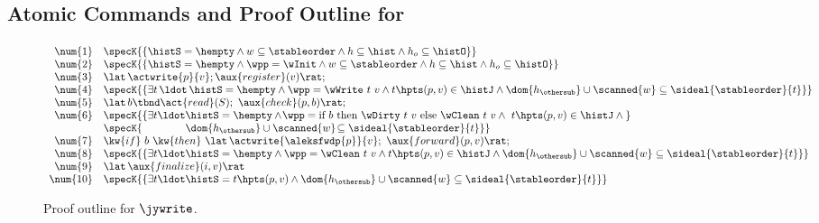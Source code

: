 \subsection{Atomic Commands and Proof Outline for \jywrite}
\label{sc:atoms-write}

\begin{figure}[t]
\[
\begin{array}[t]{r l}
  \num{1} & \specK{\{ \histS = \hempty  \wedge
                      w \subseteq \stableorder \wedge h \subseteq \hist \wedge h_o \subseteq \histO \}} \\
  \num{2} & \specK{\{ \histS = \hempty \wedge \wpp =\wInit \wedge
                      w \subseteq \stableorder \wedge h \subseteq \hist \wedge h_o \subseteq \histO \}}\\
  \num{3} &\lat\,\actwrite{p}{v}; \aux{register}(v) \rat; \\
  \num{4} & \specK{\{\exists t\, \ldot\,
                      \histS = \hempty \wedge
                      \wpp = \wWrite\ t\ v \wedge t\hpts(p,v) \in \histJ \wedge
                      \dom{h_{\othersub}} \cup \scanned{w}
                      \subseteq \sideal{\stableorder}{t}\}}\\
  \num{5} & \lat\, b \tbnd \act{read}(S);\ \aux{check}(p,b) \rat;\\
  \num{6} & \specK{\{\exists t\ldot \histS = \hempty \wedge\!
               \wpp =  \textrm{if}\ b\
               \textrm{then}\ \wDirty\ t\ v\ \textrm{else}\ \wClean\ t\ v \wedge\ t\hpts(p,v) \in \histJ \wedge \hbox{}}\\
          & \specK{\hphantom{\{\exists t\ldot \hbox{}}
              \dom{h_{\othersub}} \cup \scanned{w}\!
                   \subseteq \sideal{\stableorder}{t} 
               \}}\\
  \num{7} & \kw{if}\ b\ \kw{then}\ \lat\, \actwrite{\aleksfwdp{p}}{v};\ \aux{forward}(p,v)\rat;\\
  \num{8} & \specK{\{\exists t\ldot \histS = \hempty \wedge
                \wpp = \wClean\ t\ v \wedge t\hpts(p, v) \in \histJ \wedge
                \dom{h_{\othersub}} \cup \scanned{w} \subseteq \sideal{\stableorder}{t} \}}\\
  \num{9} & \lat\,\aux{finalize}(i,v)\rat \\
  \num{10} & \specK{\{\exists t\ldot \histS = t \hpts (p,v) \wedge
              \dom{h_{\othersub}} \cup \scanned{w} \subseteq \sideal{\stableorder}{t} \}}
\end{array}
\]
  \caption{\label{proof:write} Proof outline for $\jywrite$.}
\end{figure}
 
